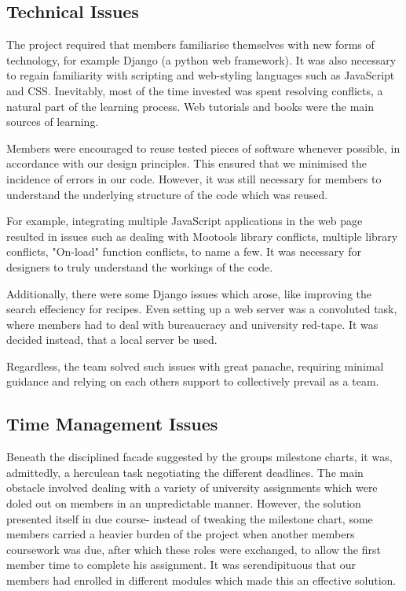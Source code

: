 \subsection{Technical Issues}

The project required that members familiarise themselves with new forms of technology, for example Django (a python web framework). It was also necessary to regain familiarity with scripting and web-styling languages such as JavaScript and CSS. Inevitably, most of the time invested was spent resolving conflicts, a natural part of the learning process. Web tutorials and books were the main sources of learning.

Members were encouraged to reuse tested pieces of software whenever possible, in accordance with our design principles. This ensured that we minimised the incidence of errors in our code. However, it was still necessary for members to understand the underlying structure of the code which was reused.

For example, integrating multiple JavaScript applications in the web page resulted in issues such as dealing with Mootools library conflicts, multiple library conflicts, "On-load" function conflicts, to name a few. It was necessary for designers to truly understand the workings of the code.

Additionally, there were some Django issues which arose, like improving the search effeciency for recipes. Even setting up a web server was a convoluted task, where members had to deal with bureaucracy and university red-tape. It was decided instead, that a local server be used.

Regardless, the team solved such issues with great panache, requiring minimal guidance and relying on each others support to collectively prevail as a team.

\subsection{Time Management Issues}

Beneath the disciplined facade suggested by the groups milestone charts, it was, admittedly, a herculean task negotiating the different deadlines. The main obstacle involved dealing with a variety of university assignments which were doled out on members in an unpredictable manner. However, the solution presented itself in due course- instead of tweaking the milestone chart, some members carried a heavier burden of the project when another members coursework was due, after which these roles were exchanged, to allow the first member time to complete his assignment. It was serendipituous that our members had enrolled in different modules which made this an effective solution.

